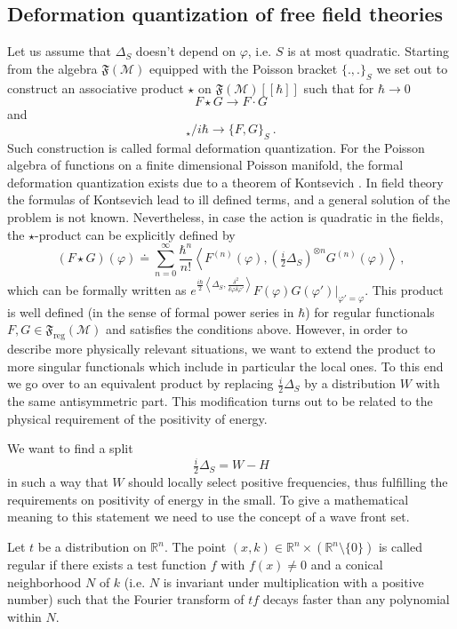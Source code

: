 \documentclass[12pt]{article}
\newcommand{\F}{\mathfrak{F}}
\newcommand{\Mcal}{\mathcal{M}}
\newcommand{\reg}{\mathrm{reg}}
\newcommand{\ph}{\varphi}
\newcommand{\Poi}[2]{\{#1,#2\}}
\newcommand{\1}{\mathds{1}}                         %
\newcommand{\be}{\begin{equation}}
\newcommand{\ee}{\end{equation}}
\begin{document}
{\subsection{Deformation quantization of free field theories}\label{deformation}
Let us assume that $\Delta_S$ doesn't depend on $\ph$, i.e. $S$ is at most quadratic. Starting from the algebra $\mathfrak{F}(\Mcal)$ equipped with the Poisson bracket $\Poi{.}{.}_S$ we set out to construct an associative product $\star$ on $\mathfrak{F}(\Mcal)[[\hbar]]$ such that for $\hbar\to0$
\be
F\star G\to F\cdot G 
\ee 
and
\be
[F,G]_{\star}/i\hbar\to \Poi{F}{G}_S \ .
\ee
Such construction is called formal deformation quantization. For the Poisson algebra of functions on a finite dimensional Poisson manifold, the formal deformation quantization exists  due to a theorem of Kontsevich \cite{Kon}. 
In field theory the formulas of Kontsevich lead to ill defined terms, and a general solution of the problem is not known. Nevertheless, in case the action is quadratic in the fields, the $\star$-product can be explicitly defined by
\be
(F\star G)(\ph)\doteq\sum\limits_{n=0}^\infty \frac{\hbar^n}{n!}\left<F^{(n)}(\ph),\left(\tfrac{i}{2}\Delta_S\right)^{\otimes n}G^{(n)}(\ph)\right>\,,
\ee 
which can be formally written as $e^{\frac{i\hbar}{2}\left\langle\Delta_S,\frac{\delta^2}{\delta\ph\delta\ph'}\right\rangle}F(\ph)G(\ph')|_{\ph'=\ph}$.
This product is well defined (in the sense of formal power series in $\hbar$) for regular functionals $F,G\in\F_\reg(\Mcal)$ and satisfies the conditions above. However, in order to describe more physically relevant situations, we want to extend the product to more singular functionals which include in particular the local ones. To this end we go over to an equivalent product by replacing $\frac{i}{2}\Delta_S$ by a distribution $W$ with the same antisymmetric part. This modification turns out to be related to the physical requirement of the positivity of energy. 

We want to find a split
\be
\tfrac{i}{2}\Delta_S=W-H
\ee
in such a way that $W$ should locally select positive frequencies, thus fulfilling the requirements on positivity of energy in the small. To give a mathematical meaning to this statement we need to use the concept of a wave front set.
{\begin{df}\label{WFset}
Let $t$ be a distribution on $\mathbb R^n$. The point $(x,k)\in\mathbb R^n\times(\mathbb R^n\setminus\{0\})$ is called regular if there exists a test function $f$ with $f(x)\neq0$ and a conical neighborhood $N$ of $k$ (i.e. $N$ is invariant under multiplication with a positive number) such that the Fourier transform of $tf$ decays faster than any polynomial within $N$. 


\end{df}}}
\end{document}
